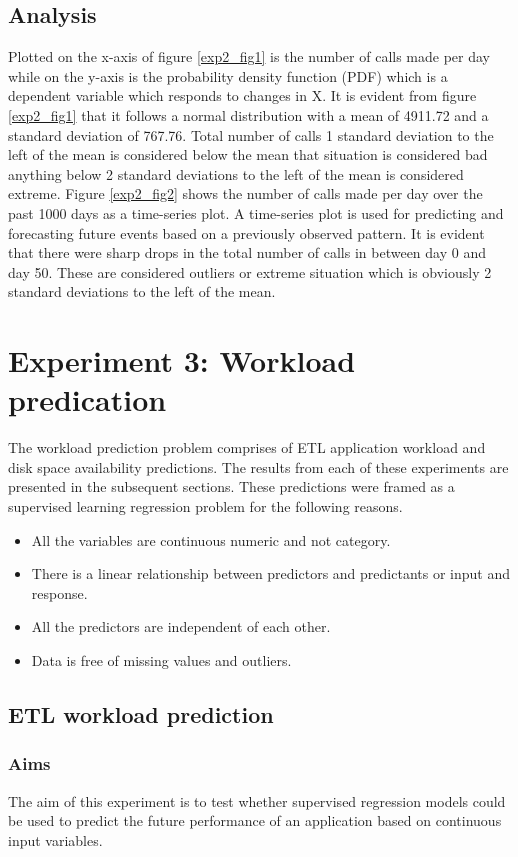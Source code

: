 \documentclass[12pt, letterpaper, titlepage]{report}
\begin{document}
\subsection{Analysis}
Plotted on the x-axis of figure \ref{exp2_fig1} is the number of calls made per day while on the y-axis is the probability density function (PDF) which is a dependent variable which responds to changes in X.
It is evident from figure \ref{exp2_fig1} that it follows a normal distribution with a mean of 4911.72 and a standard deviation of 767.76. Total number of calls 1 standard deviation to the left of the mean is considered below the mean that situation is considered bad anything below 2 standard deviations to the left of the mean is considered extreme. Figure \ref{exp2_fig2} shows the number of calls made per day over the past 1000 days as a time-series plot. A time-series plot is used for predicting and forecasting future events based on a previously observed pattern. It is evident that there were sharp drops in the total number of calls in between day 0 and day 50. These are considered outliers or extreme situation which is obviously 2 standard deviations to the left of the mean.

\section{Experiment 3: Workload predication}
The workload prediction problem comprises of ETL application workload and disk space availability predictions. The results from each of these experiments are presented in the subsequent sections. These predictions were framed as a supervised learning regression problem for the following reasons.

\begin{itemize}
	\item All the variables are continuous numeric and not category.
	\item There is a linear relationship between predictors and predictants or input and response.
	\item All the predictors are independent of each other.
	\item Data is free of missing values and outliers.
\end{itemize}

\subsection{ETL workload prediction}
\subsubsection{Aims}
The aim of this experiment is to test whether supervised regression models could be used to predict the future performance of an application based on continuous input variables. 
\end{document}
